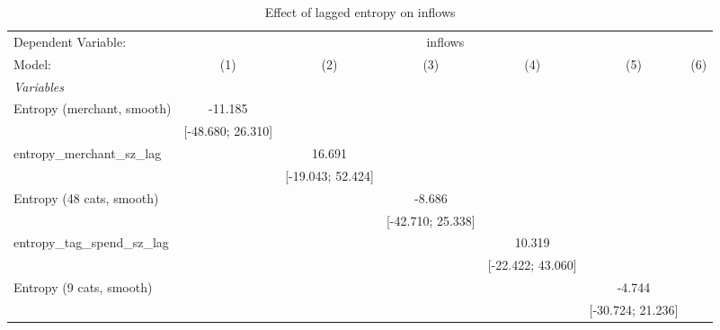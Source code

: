 
\begin{table}[htbp]
   \centering
   \tiny
   \begin{threeparttable}[b]
      \caption{\label{tab:reg_inflows_lagged_sz} Effect of lagged entropy on inflows}
      \begin{tabular}{lcccccc}
         \tabularnewline \midrule \midrule
         Dependent Variable: & \multicolumn{6}{c}{inflows}\\
         Model:                           & (1)                 & (2)                 & (3)                 & (4)                 & (5)                 & (6)\\  
         \midrule
         \emph{Variables}\\
         Entropy (merchant, smooth)       & -11.185             &                     &                     &                     &                     &   \\   
                                          & [-48.680; 26.310]   &                     &                     &                     &                     &   \\   
         entropy\_merchant\_sz\_lag       &                     & 16.691              &                     &                     &                     &   \\   
                                          &                     & [-19.043; 52.424]   &                     &                     &                     &   \\   
         Entropy (48 cats, smooth)        &                     &                     & -8.686              &                     &                     &   \\   
                                          &                     &                     & [-42.710; 25.338]   &                     &                     &   \\   
         entropy\_tag\_spend\_sz\_lag     &                     &                     &                     & 10.319              &                     &   \\   
                                          &                     &                     &                     & [-22.422; 43.060]   &                     &   \\   
         Entropy (9 cats, smooth)         &                     &                     &                     &                     & -4.744              &   \\   
                                          &                     &                     &                     &                     & [-30.724; 21.236]   &   \\   

\end{tabular}
\end{threeparttable}
\end{table}
